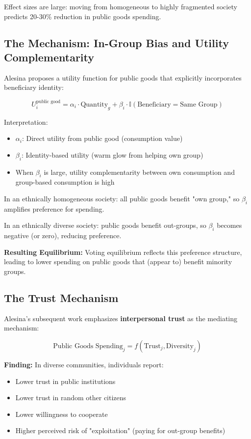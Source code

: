 Effect sizes are large: moving from homogeneous to highly fragmented society predicts 20-30\% reduction in public goods spending.

\subsection{The Mechanism: In-Group Bias and Utility Complementarity}

Alesina proposes a utility function for public goods that explicitly incorporates beneficiary identity:

\begin{equation}
U_i^{\text{public good}} = \alpha_i \cdot \text{Quantity}_g + \beta_i \cdot \mathbb{I}(\text{Beneficiary}=\text{Same Group})
\end{equation}

Interpretation:
\begin{itemize}
\item $\alpha_i$: Direct utility from public good (consumption value)
\item $\beta_i$: Identity-based utility (warm glow from helping own group)
\item When $\beta_i$ is large, utility complementarity between own consumption and group-based consumption is high
\end{itemize}

In an ethnically homogeneous society: all public goods benefit "own group," so $\beta_i$ amplifies preference for spending.

In an ethnically diverse society: public goods benefit out-groups, so $\beta_i$ becomes negative (or zero), reducing preference.

\textbf{Resulting Equilibrium:} Voting equilibrium reflects this preference structure, leading to lower spending on public goods that (appear to) benefit minority groups.

\subsection{The Trust Mechanism}

Alesina's subsequent work emphasizes \textbf{interpersonal trust} as the mediating mechanism:

\begin{equation}
\text{Public Goods Spending}_j = f(\text{Trust}_j, \text{Diversity}_j)
\end{equation}

\textbf{Finding:} In diverse communities, individuals report:
\begin{itemize}
\item Lower trust in public institutions
\item Lower trust in random other citizens
\item Lower willingness to cooperate
\item Higher perceived risk of "exploitation" (paying for out-group benefits)
\end{itemize}

